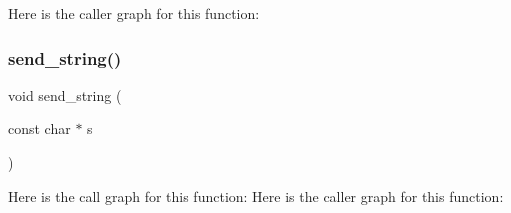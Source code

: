 Here is the caller graph for this function\+:
\mbox{\label{_pelt__uart_8h_a9161f57780d037622c9697e56fffe3e5}} 
\subsubsection{send\+\_\+string()}
{\footnotesize\ttfamily void send\+\_\+string (\begin{DoxyParamCaption}\item[{const char $\ast$}]{s }\end{DoxyParamCaption})}

Here is the call graph for this function\+:
Here is the caller graph for this function\+:
